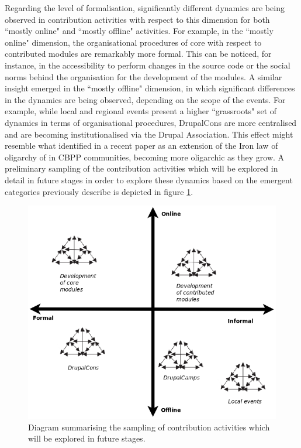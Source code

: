 \documentclass[a4paper, 12pt]{article}
\begin{document}
Regarding the level of formalisation, significantly different dynamics are being observed in contribution activities with respect to this dimension for both ``mostly online" and ``mostly offline" activities.  For example, in the ``mostly online" dimension, the organisational procedures of core with respect to contributed modules are remarkably more formal. This can be noticed, for instance, in the accessibility to perform changes in the source code or the social norms behind the organisation for the development of the modules. A similar insight emerged in the ``mostly offline" dimension, in which significant differences in the dynamics are being observed, depending on the scope of the events. For example, while local and regional events present a higher ``grassroots" set of dynamics in terms of organisational procedures, DrupalCons are more centralised and are becoming institutionalised via the Drupal Association. This effect might resemble what \textcite{shaw2014laboratories} identified in a recent paper as an extension of the Iron law of oligarchy of \textcite{michels1915political} in CBPP communities, becoming more oligarchic as they grow. A preliminary sampling of the contribution activities which will be explored in detail in future stages in order to explore these dynamics based on the emergent categories previously describe is depicted in figure \ref{future-work-activities}. 


\begin{figure}[h]
	\centering
	\includegraphics[scale=0.4]{./diagrams/future_work_activities_dimension.png}
	\caption{Diagram summarising the sampling of contribution activities which will be explored in future stages.}
	\label{future-work-activities}
\end{figure}
\end{document}
